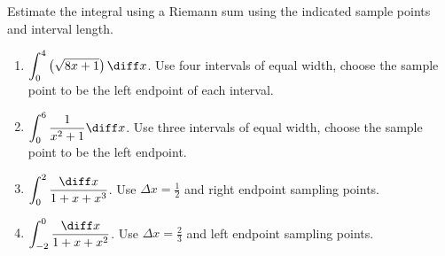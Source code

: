 Estimate the integral using a Riemann sum using the indicated sample points and interval length.
\begin{enumerate}[ref={\fcProblemRef}]
\item\label{problemRiemannSum-sqrt(8x+1)} $\displaystyle \int_0^4 \left(\sqrt{8x+1}\right)\diff x$. Use four intervals of equal width, choose the sample point to be the left endpoint of each interval. 


\item $\displaystyle \int_0^6 \frac{1}{x^2+1} \diff x$. Use three intervals of equal width, choose the sample point to be the left endpoint. 


\item $\displaystyle\int_{0}^2 \frac{\diff x}{1+x+x^3}$. Use $\Delta x=\frac{1}2 $ and right endpoint sampling points.

\item $\displaystyle\int_{-2}^{0} \frac{\diff x}{1+x+x^2}$. Use $\Delta x=\frac23 $ and left endpoint sampling points.


\end{enumerate}


